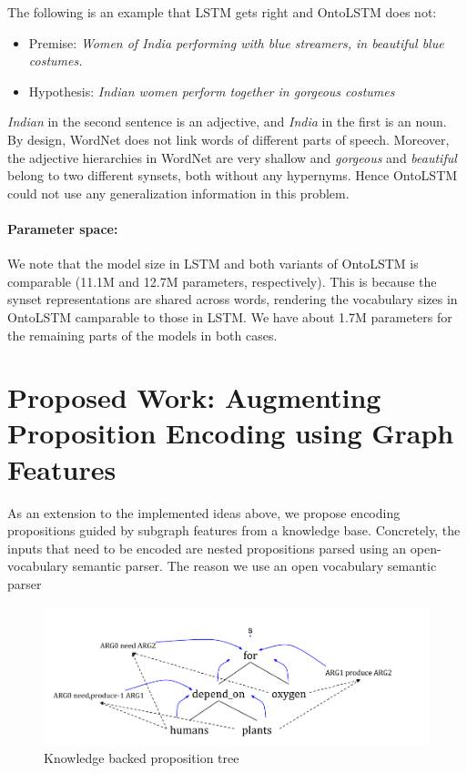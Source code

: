 The following is an example that LSTM gets right and OntoLSTM does not:
\begin{itemize}
 \item Premise: \textit{Women of India performing with blue streamers, in beautiful blue costumes.}
 \item Hypothesis: \textit{Indian women perform together in gorgeous costumes}
\end{itemize}
\textit{Indian} in the second sentence is an adjective, and \textit{India} in the first is an noun. By design, WordNet does not link words of different parts of speech. Moreover, the adjective hierarchies in WordNet are very shallow and \textit{gorgeous} and \textit{beautiful} belong to two different synsets, both without any hypernyms. Hence OntoLSTM could not use any generalization information in this problem.

\paragraph{Parameter space:} We note that the model size in LSTM and both variants of OntoLSTM is comparable (11.1M and 12.7M parameters, respectively). This is because the synset representations are shared across words, rendering the vocabulary sizes in OntoLSTM camparable to those in LSTM. We have about 1.7M parameters for the remaining parts of the models in both cases. 

\section{Proposed Work: Augmenting Proposition Encoding using Graph Features}
As an extension to the implemented ideas above, we propose encoding propositions guided by subgraph features from a knowledge base. Concretely, the inputs that need to be encoded are nested propositions parsed using an open-vocabulary semantic parser. The reason we use an open vocabulary
semantic parser 
\begin{figure}
\begin{center}
\includegraphics[width=5in]{figures/knowledge_backed_prop_tree.png}
\caption{Knowledge backed proposition tree}
\label{fig:kb_prop_tree}
\end{center}
\end{figure}